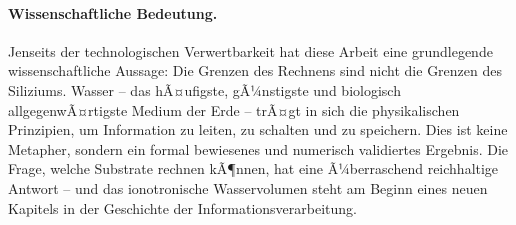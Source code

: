﻿\documentclass[a4paper,12pt]{scrreprt}
\theoremstyle{definition}
\begin{document}
\paragraph{Wissenschaftliche Bedeutung.}
Jenseits der technologischen Verwertbarkeit hat diese Arbeit eine
grundlegende wissenschaftliche Aussage: Die Grenzen des Rechnens
sind nicht die Grenzen des Siliziums. Wasser -- das hÃ¤ufigste,
gÃ¼nstigste und biologisch allgegenwÃ¤rtigste Medium der Erde --
trÃ¤gt in sich die physikalischen Prinzipien, um Information zu
leiten, zu schalten und zu speichern. Dies ist keine Metapher,
sondern ein formal bewiesenes und numerisch validiertes Ergebnis.
Die Frage, welche Substrate rechnen kÃ¶nnen, hat eine Ã¼berraschend
reichhaltige Antwort -- und das ionotronische Wasservolumen steht
am Beginn eines neuen Kapitels in der Geschichte der Informationsverarbeitung.
\end{document}
